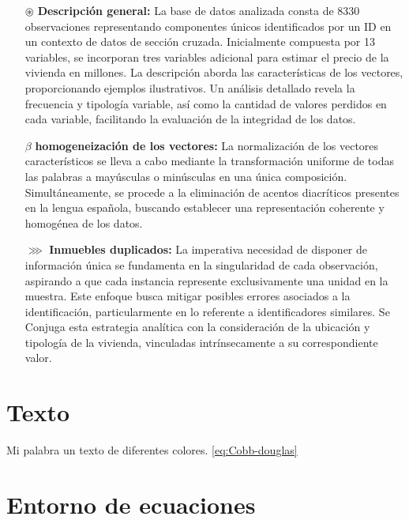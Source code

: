 \documentclass[12pt]{article}
\begin{document}
\begin{itemize} %
    \item[$\circledast$] \textbf{Descripción general:} La base de datos analizada consta de 8330 observaciones representando componentes únicos identificados por un ID en un contexto de datos de sección cruzada. Inicialmente compuesta por 13 variables, se incorporan tres variables adicional para estimar el precio de la vivienda en millones. La descripción aborda las características de los vectores, proporcionando ejemplos ilustrativos. Un análisis detallado revela la frecuencia y tipología variable, así como la cantidad de valores perdidos en cada variable, facilitando la evaluación de la integridad de los datos.
     \item[$\beta$] \textbf{homogeneización de los vectores:} La normalización de los vectores característicos se lleva a cabo mediante la transformación uniforme de todas las palabras a mayúsculas o minúsculas en una única composición. Simultáneamente, se procede a la eliminación de acentos diacríticos presentes en la lengua española, buscando establecer una representación coherente y homogénea de los datos.
    \item[$\ggg$] \textbf{Inmuebles duplicados:} La imperativa necesidad de disponer de información única se fundamenta en la singularidad de cada observación, aspirando a que cada instancia represente exclusivamente una unidad en la muestra. Este enfoque busca mitigar posibles errores asociados a la identificación, particularmente en lo referente a identificadores similares. Se Conjuga esta estrategia analítica con la consideración de la ubicación y tipología de la vivienda, vinculadas intrínsecamente a su correspondiente valor.   
\end{itemize}

\section{Texto}



\textcolor{airforceblue}{Mi palabra} \textcolor{Nicolas}{un texto} \textcolor{byzantine}{de diferentes colores.} \ref{eq:Cobb-douglas}


\section{Entorno de ecuaciones}
\end{document}
